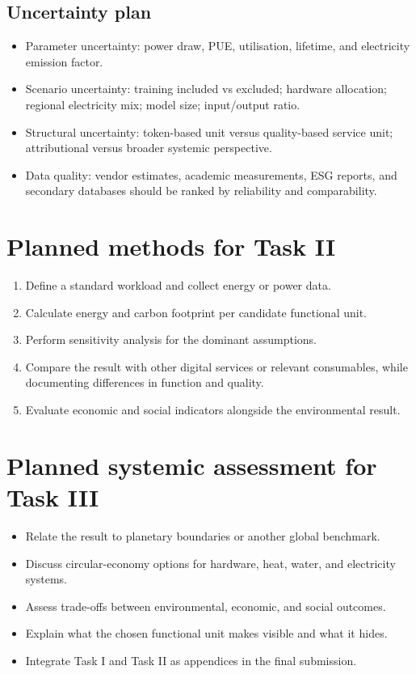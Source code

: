 \documentclass[11pt,a4paper]{article}
\begin{document}
\subsection{Uncertainty plan}
\begin{itemize}[leftmargin=*]
    \item Parameter uncertainty: power draw, PUE, utilisation, lifetime, and
    electricity emission factor.
    \item Scenario uncertainty: training included vs excluded; hardware allocation;
    regional electricity mix; model size; input/output ratio.
    \item Structural uncertainty: token-based unit versus quality-based service
    unit; attributional versus broader systemic perspective.
    \item Data quality: vendor estimates, academic measurements, ESG reports, and
    secondary databases should be ranked by reliability and comparability.
\end{itemize}

\section{Planned methods for Task II}
\begin{enumerate}[leftmargin=*]
    \item Define a standard workload and collect energy or power data.
    \item Calculate energy and carbon footprint per candidate functional unit.
    \item Perform sensitivity analysis for the dominant assumptions.
    \item Compare the result with other digital services or relevant consumables,
    while documenting differences in function and quality.
    \item Evaluate economic and social indicators alongside the environmental result.
\end{enumerate}

\section{Planned systemic assessment for Task III}
\begin{itemize}[leftmargin=*]
    \item Relate the result to planetary boundaries or another global benchmark.
    \item Discuss circular-economy options for hardware, heat, water, and
    electricity systems.
    \item Assess trade-offs between environmental, economic, and social outcomes.
    \item Explain what the chosen functional unit makes visible and what it hides.
    \item Integrate Task I and Task II as appendices in the final submission.
\end{itemize}
\end{document}
